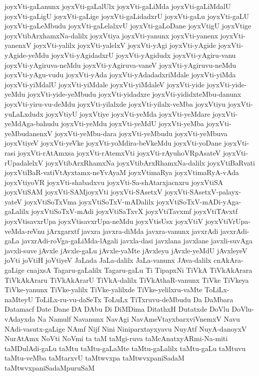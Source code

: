 {joyxVti-gaLanunx
joyxVti-gaLalUlx
joyxVti-gaLiMda
joyxVti-gaLiMdalU
joyxVti-gaLigU
joyxVti-gaLige
joyxVti-gaLidadxrU
joyxVti-gaLu
joyxVti-gaLU
joyxVti-gaLeMbudu
joyxVti-gaLelalxvU
joyxVti-gaLoDane
joyxVtigU
joyxVtige
joyxVtibArxhamxNa-dalilx
joyxVtiya
joyxVti-yanunx
joyxVti-yanenx
joyxVti-yanenxV
joyxVti-yalilx
joyxVti-yalelxV
joyxVti-yAgi
joyxVti-yAgide
joyxVti-yAgide-yeMdu
joyxVti-yAgidadxrU
joyxVti-yAgidudx
joyxVti-yAgiru-vanu
joyxVti-yAgiruva-neMdu
joyxVti-yAgiruva-vaneV
joyxVti-yAgiruvu-neMdu
joyxVti-yAgu-vudu
joyxVti-yAda
joyxVti-yAdadadxriMdale
joyxVti-yiMda
joyxVti-yiMdalU
joyxVti-yiMdale
joyxVti-yiMdaleV
joyxVti-yide
joyxVti-yide-yeMdu
joyxVti-yide-yeMbudu
joyxVti-yidadxre
joyxVti-yididxteMbu-danunx
joyxVti-yiru-vu-deMdu
joyxVti-yilalxde
joyxVti-yilalx-veMba
joyxVtiyu
joyxVti-yuLaLxdudx
joyxVtiyU
joyxVtiye
joyxVti-yeMda
joyxVti-yeMdare
joyxVti-yeMdAga-bahudu
joyxVti-yeMdu
joyxVti-yeMdU
joyxVti-yeMba
joyxVti-yeMbudanenxV
joyxVti-yeMbu-dara
joyxVti-yeMbudu
joyxVti-yeMbuva
joyxVtiyeV
joyxVti-yeVke
joyxVti-yoMdira-beVkeMdu
joyxVti-yoDane
joyxVti-rasi
joyxVti-rAtAmxsa
joyxVti-rAtemxVti
joyxVti-rAyuhoVRpAsateV
joyxVti-rUpadalelxV
joyxVtibArxRhamxNa
joyxVtibArxRhamxNa-dalilx
joyxVtiBaRvati
joyxVtiBaR-vatiVtAyxtamx-neYvAyaM
joyxVtimaRya
joyxVtimaRyA-vAda
joyxVtiyoVR
joyxVti-shabadxvu
joyxVti-Sa-shAtarxjacnxru
joyxVtiSA
joyxVtiSAM
joyxVti-SAMjoyxVti
joyxVti-SAsetxV
joyxVti-SAsetxV-palayx-yateV
joyxVtiSoTxVma
joyxVtiSoTxV-mADalilx
joyxVtiSoTxV-mADi-yAga-gaLalilx
joyxVtiSoTxV-mAdi
joyxVtiSaTxvX
joyxVtiTavxmf
joyxVtiTAvxtf
joyxVtisavxrUpa
joyxVtisavxrUpa-neMdu
joyxVtisUsx
joyxVtiV
joyxVtiVrUpa-veMda-reVnu
jArxgarxtf
javxra
javxra-diMda
javxra-vanunx
javxrAdi
javxrAdi-gaLa
javxrAdi-roVga-gaLiMda-lAgali
javxla-dasi
javxlana
javxlane
javxli-suvAga
javxli-suve
jAvxle
jAvxle-gaLu
jAvxle-yaMte
jAvxleyu
jAvxle-yeMdU
jAvxleyeV
joVti
joVtiH
joVtiyeV
JaLada
JaLa-dalilx
JaLa-vanunx
JAva-dalilx
cnAkAra-gaLige
cnajxsA
Tagaru-gaLalilx
Tagaru-gaLu
Ti
TipapxNi
TiVkA
TiVkAkArara
TiVkAkAraru
TiVkAkArarU
TiVkA-dalilx
TiVkAthaR-vanunx
TiVke
TiVkeya
TiVke-yanunx
TiVke-yalilx
TiVke-yalilxde
TiVke-yelilxru-vaMte
ToLiLx-naMteyU
ToLiLx-ru-vu-daSeTx
ToLuLx
TiTxruvu-deMbudu
Da
DaMbara
Datamacf
Date
Dane
DA
DAbu
Di
DiMDima
DitathxH
Dutatxde
DoVlu
DoVlu-vAdayxda
Na
Namulf
Navanunx
NavAgi
NavAmeVtayxbarxviVnemxV
Navu
NAdi-vasutx-gaLige
NAmf
Nijf
Nini
Niniparxtayxyavu
NuyAtf
NuyA-danoyxV
NurAtAmx
NoVti
NoVmi
ta
taM
taMgi-ruva
taMcAnatxyARmi-Na-miti
taMDulAdi-gaLu
taMtu
taMtu-gaLaMte
taMtu-gaLalilx
taMtu-gaLu
taMtuvu
taMtu-veMba
taMtarxvU
taMtwvxpa
taMtwvxpaniSadaM
taMtwvxpaniSadaMpuruSaM
}
